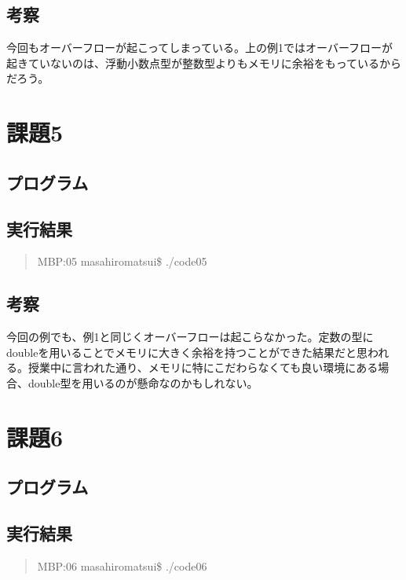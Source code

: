 \documentclass[11pt,a4paper]{jsarticle}
\begin{document}
\subsection{考察}
今回もオーバーフローが起こってしまっている。上の例1ではオーバーフローが起きていないのは、浮動小数点型が整数型よりもメモリに余裕をもっているからだろう。
%
\section{課題5}

\subsection{プログラム}
\label{sec:prog-list1}


\subsection{実行結果}
\begin{quote}           %
MBP:05 masahiromatsui\$ ./code05 \\

\end{quote}
%
\subsection{考察}
今回の例でも、例1と同じくオーバーフローは起こらなかった。定数の型にdoubleを用いることでメモリに大きく余裕を持つことができた結果だと思われる。授業中に言われた通り、メモリに特にこだわらなくても良い環境にある場合、double型を用いるのが懸命なのかもしれない。
%

\section{課題6}

\subsection{プログラム}
\label{sec:prog-list1}

%
\subsection{実行結果}
\begin{quote}           %
MBP:06 masahiromatsui\$ ./code06 \\

\end{quote}
%
\end{document}
